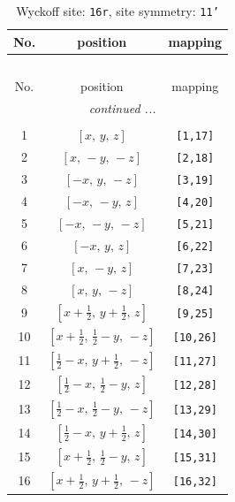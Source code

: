 \documentclass[fleqn,8pt]{jsarticle}
\begin{document}
\begin{longtable}{ccc}
\caption{Wyckoff site: {\tt 16r}, site symmetry: {\tt 11'}}
 \\
 \hline \hline
No. & position & mapping \\ \hline \endfirsthead

\multicolumn{2}{l}{\tablename\ \thetable{}} \\
 \hline \hline
No. & position & mapping \\ \hline \endhead

 \hline \hline
\multicolumn{2}{r}{\footnotesize\it continued ...} \\ \endfoot

 \hline \hline
\multicolumn{2}{r}{} \\ \endlastfoot

1 & $\left[ x,\, y,\, z \right]$ & {\tt [1,17]} \\ \hline
2 & $\left[ x,\, - y,\, - z \right]$ & {\tt [2,18]} \\ \hline
3 & $\left[ - x,\, y,\, - z \right]$ & {\tt [3,19]} \\ \hline
4 & $\left[ - x,\, - y,\, z \right]$ & {\tt [4,20]} \\ \hline
5 & $\left[ - x,\, - y,\, - z \right]$ & {\tt [5,21]} \\ \hline
6 & $\left[ - x,\, y,\, z \right]$ & {\tt [6,22]} \\ \hline
7 & $\left[ x,\, - y,\, z \right]$ & {\tt [7,23]} \\ \hline
8 & $\left[ x,\, y,\, - z \right]$ & {\tt [8,24]} \\ \hline
9 & $\left[ x + \frac{1}{2},\, y + \frac{1}{2},\, z \right]$ & {\tt [9,25]} \\ \hline
10 & $\left[ x + \frac{1}{2},\, \frac{1}{2} - y,\, - z \right]$ & {\tt [10,26]} \\ \hline
11 & $\left[ \frac{1}{2} - x,\, y + \frac{1}{2},\, - z \right]$ & {\tt [11,27]} \\ \hline
12 & $\left[ \frac{1}{2} - x,\, \frac{1}{2} - y,\, z \right]$ & {\tt [12,28]} \\ \hline
13 & $\left[ \frac{1}{2} - x,\, \frac{1}{2} - y,\, - z \right]$ & {\tt [13,29]} \\ \hline
14 & $\left[ \frac{1}{2} - x,\, y + \frac{1}{2},\, z \right]$ & {\tt [14,30]} \\ \hline
15 & $\left[ x + \frac{1}{2},\, \frac{1}{2} - y,\, z \right]$ & {\tt [15,31]} \\ \hline
16 & $\left[ x + \frac{1}{2},\, y + \frac{1}{2},\, - z \right]$ & {\tt [16,32]} \\
\end{longtable}
\end{document}
